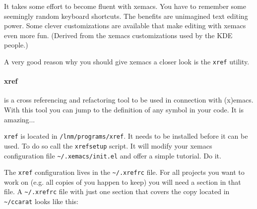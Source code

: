 It takes some effort to become fluent with xemacs. You have to remember
some seemingly random keyboard shortcuts. The benefits are unimagined
text editing power. Some clever customizations are available that
make editing with xemacs even more fun. (Derived from the xemacs customizations
used by the KDE people.)

A very good reason why you should give xemacs a closer look is the
\texttt{xref} utility.


\paragraph{xref}

is a cross referencing and refactoring tool to be used in connection
with (x)emacs. With this tool you can jump to the definition of any
symbol in your code. It is amazing...

\texttt{xref} is located in \texttt{/lnm/programs/xref}. It needs
to be installed before it can be used. To do so call the \texttt{xrefsetup}
script. It will modify your xemacs configuration file \texttt{\textasciitilde{}/.xemacs/init.el}
and offer a simple tutorial. Do it.

The \texttt{xref} configuration lives in the \texttt{\textasciitilde{}/.xrefrc}
file. For all projects you want to work on (e.g. all copies of \ccarat{}
you happen to keep) you will need a section in that file. A \texttt{\textasciitilde{}/.xrefrc}
file with just one section that covers the \ccarat{} copy located
in \texttt{\textasciitilde{}/ccarat} looks like this:

